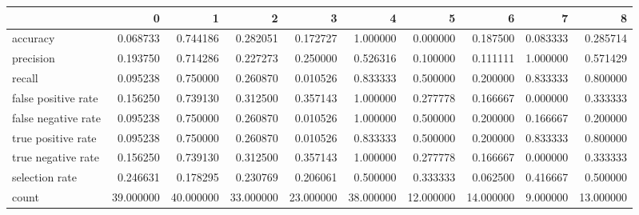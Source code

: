 \begin{tabular}{lrrrrrrrrr}
\toprule
{} &          0 &          1 &          2 &          3 &          4 &          5 &          6 &         7 &          8 \\
\midrule
accuracy            &   0.068733 &   0.744186 &   0.282051 &   0.172727 &   1.000000 &   0.000000 &   0.187500 &  0.083333 &   0.285714 \\
precision           &   0.193750 &   0.714286 &   0.227273 &   0.250000 &   0.526316 &   0.100000 &   0.111111 &  1.000000 &   0.571429 \\
recall              &   0.095238 &   0.750000 &   0.260870 &   0.010526 &   0.833333 &   0.500000 &   0.200000 &  0.833333 &   0.800000 \\
false positive rate &   0.156250 &   0.739130 &   0.312500 &   0.357143 &   1.000000 &   0.277778 &   0.166667 &  0.000000 &   0.333333 \\
false negative rate &   0.095238 &   0.750000 &   0.260870 &   0.010526 &   1.000000 &   0.500000 &   0.200000 &  0.166667 &   0.200000 \\
true positive rate  &   0.095238 &   0.750000 &   0.260870 &   0.010526 &   0.833333 &   0.500000 &   0.200000 &  0.833333 &   0.800000 \\
true negative rate  &   0.156250 &   0.739130 &   0.312500 &   0.357143 &   1.000000 &   0.277778 &   0.166667 &  0.000000 &   0.333333 \\
selection rate      &   0.246631 &   0.178295 &   0.230769 &   0.206061 &   0.500000 &   0.333333 &   0.062500 &  0.416667 &   0.500000 \\
count               &  39.000000 &  40.000000 &  33.000000 &  23.000000 &  38.000000 &  12.000000 &  14.000000 &  9.000000 &  13.000000 \\
\bottomrule
\end{tabular}
